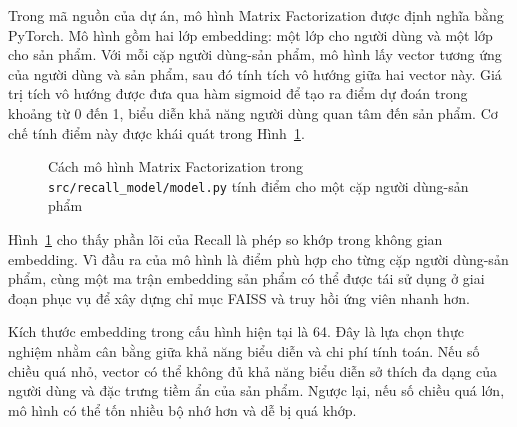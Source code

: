 Trong mã nguồn của dự án, mô hình Matrix Factorization được định nghĩa bằng PyTorch. Mô hình gồm hai lớp embedding: một lớp cho người dùng và một lớp cho sản phẩm. Với mỗi cặp người dùng-sản phẩm, mô hình lấy vector tương ứng của người dùng và sản phẩm, sau đó tính tích vô hướng giữa hai vector này. Giá trị tích vô hướng được đưa qua hàm sigmoid để tạo ra điểm dự đoán trong khoảng từ 0 đến 1, biểu diễn khả năng người dùng quan tâm đến sản phẩm. Cơ chế tính điểm này được khái quát trong Hình~\ref{fig:matrix_factorization}.

\begin{figure}[H]
\centering
{}
\caption[Sơ đồ Matrix Factorization]{Cách mô hình Matrix Factorization trong \texttt{src/recall\_model/model.py} tính điểm cho một cặp người dùng-sản phẩm}
\label{fig:matrix_factorization}
\end{figure}

Hình~\ref{fig:matrix_factorization} cho thấy phần lõi của Recall là phép so khớp trong không gian embedding. Vì đầu ra của mô hình là điểm phù hợp cho từng cặp người dùng-sản phẩm, cùng một ma trận embedding sản phẩm có thể được tái sử dụng ở giai đoạn phục vụ để xây dựng chỉ mục FAISS và truy hồi ứng viên nhanh hơn.
\medskip

Kích thước embedding trong cấu hình hiện tại là 64. Đây là lựa chọn thực nghiệm nhằm cân bằng giữa khả năng biểu diễn và chi phí tính toán. Nếu số chiều quá nhỏ, vector có thể không đủ khả năng biểu diễn sở thích đa dạng của người dùng và đặc trưng tiềm ẩn của sản phẩm. Ngược lại, nếu số chiều quá lớn, mô hình có thể tốn nhiều bộ nhớ hơn và dễ bị quá khớp.

